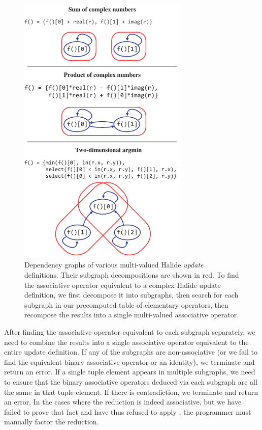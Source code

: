 \begin{figure}
\centering
\includegraphics[width=3.2in]{subgraphs}
\caption{Dependency graphs of various multi-valued Halide \emph{update} definitions. Their subgraph decompositions are shown in red. To find the associative operator equivalent to a complex Halide update definition, we first decompose it into subgraphs, then search for each subgraph in our precomputed table of elementary operators, then recompose the results into a single multi-valued associative operator.}
\label{fig:subgraphs}
\end{figure}

After finding the associative operator equivalent to each subgraph separately, we need to combine the results into a single associative operator equivalent to the entire update definition. If any of the subgraphs are non-associative (or we fail to find the equivalent binary associative operator or an identity), we terminate and return an error. If a single tuple element appears in multiple subgraphs, we need to ensure that the binary associative operators deduced via each subgraph are all the same in that tuple element. If there is contradiction, we terminate and return an error. In the cases where the reduction is indeed associative, but we have failed to prove that fact and have thus refused to apply , the programmer must manually factor the reduction.

